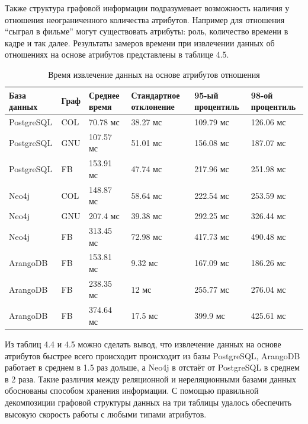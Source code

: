 Также структура графовой информации подразумевает возможность наличия у отношения неограниченного количества атрибутов. Например для
отношения “сыграл в фильме” могут существовать атрибуты: роль, количество времени в кадре и так далее. Результаты замеров времени при
извлечении данных об отношениях на основе атрибутов представлены в таблице 4.5.

\begin{table} [htbp]
    \centering\small
    \caption{Время извлечение данных на основе атрибутов отношения}
    \begin{tabular}{|p{3cm}|p{1cm}|p{2cm}|p{2cm}|p{2cm}|p{2cm}|}
        \hline
        База данных & Граф & Среднее время & Стандартное отклонение & 95-ый процентиль & 98-ой процентиль \\ \hline
        PostgreSQL  & COL  & 70.78 мс      & 38.27 мс               & 109.79 мс        & 126.06 мс        \\ \hline
        PostgreSQL  & GNU  & 107.57 мс     & 51.01 мс               & 156.08 мс        & 187.07 мс        \\ \hline
        PostgreSQL  & FB   & 153.91 мс     & 47.74 мс               & 217.96 мс        & 251.98 мс        \\ \hline
        Neo4j       & COL  & 148.87 мс     & 58.64 мс               & 222.54 мс        & 253.59 мс        \\ \hline
        Neo4j       & GNU  & 207.4 мс      & 39.38 мс               & 292.25 мс        & 326.44 мс        \\ \hline
        Neo4j       & FB   & 313.45 мс     & 72.98 мс               & 417.73 мс        & 490.48 мс        \\ \hline
        ArangoDB    & FB   & 153.81 мс     & 9.32 мс                & 167.09 мс        & 186.26 мс        \\ \hline
        ArangoDB    & FB   & 238.35 мс     & 12 мс                  & 255.77 мс        & 276.04 мс        \\ \hline
        ArangoDB    & FB   & 374.64 мс     & 17.5 мс                & 399.9 мс         & 425.61 мс        \\ \hline
    \end{tabular}
    \normalsize
\end{table}

Из таблиц 4.4 и 4.5 можно сделать вывод, что извлечение данных на основе атрибутов быстрее всего происходит происходит из базы PostgreSQL,
ArangoDB работает в среднем в 1.5 раз дольше, а Neo4j в отстаёт от PostgreSQL в среднем в 2 раза. Такие различия между реляционной и
нереляционными базами данных обоснованы способом хранения информации. С помощью правильной декомпозиции графовой структуры данных на три
таблицы удалось обеспечить высокую скорость работы с любыми типами атрибутов.

